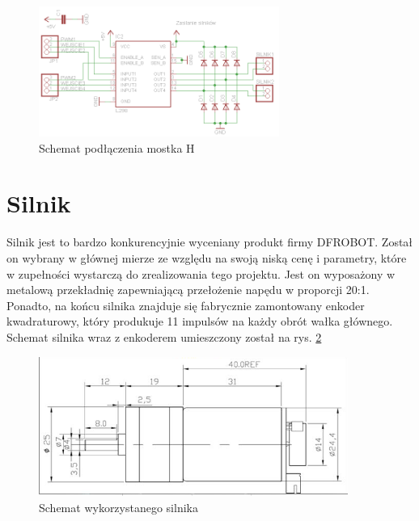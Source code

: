             \begin{figure}[ht]
                \centering
                \includegraphics[width=0.7\textwidth]{img/h_bridge_connection.png}
                \caption{Schemat podłączenia mostka H \cite{h_bridge_conn_fig}}
                \label{fig:h_bridge_connection}
            \end{figure}
            
        \section{Silnik}
            Silnik jest to bardzo konkurencyjnie wyceniany produkt firmy DFROBOT. Został on wybrany w głównej mierze ze względu na swoją niską cenę i parametry, które w zupełności wystarczą do zrealizowania tego projektu. Jest on wyposażony w metalową przekładnię zapewniającą przełożenie napędu w proporcji 20:1. Ponadto, na końcu silnika znajduje się fabrycznie zamontowany enkoder kwadraturowy, który produkuje 11 impulsów na każdy obrót wałka głównego. Schemat silnika wraz z enkoderem umieszczony został na rys. \ref{fig:engine}
            
            \begin{figure}[ht]
                \centering
                \includegraphics[width=0.9\textwidth]{img/silnik.png}
                \caption{Schemat wykorzystanego silnika \cite{engine_fig}}
                \label{fig:engine}
            \end{figure}


